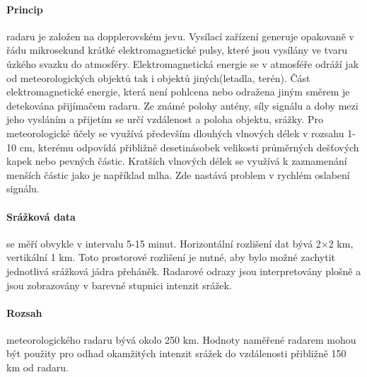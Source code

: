 \documentclass[a4paper,12pt]{article}
\begin{document}
\paragraph*{Princip}
radaru je založen na dopplerovském jevu.\cite{radar_meterology} Vysílací zařízení generuje opakovaně v řádu mikrosekund krátké elektromagnetické pulsy, které jsou vysílány ve tvaru úzkého svazku do atmosféry. Elektromagnetická energie se v atmosféře odráží jak od meteorologických objektů tak i objektů jiných(letadla, terén). Část elektromagnetické energie, která není pohlcena nebo odražena jiným směrem je detekována přijímačem radaru. Ze známé polohy antény, síly signálu a doby mezi jeho vysláním a přijetím se určí vzdálenost a poloha objektu, srážky. 
Pro meteorologické účely se využívá především dlouhých vlnových délek v rozsahu 1-10 cm, kterému odpovídá přibližně desetinásobek velikosti průměrných dešťových kapek nebo pevných částic. Kratších vlnových délek se využívá k zaznamenání menších částic jako je například mlha. Zde nastává problem v rychlém oslabení signálu.\cite{doppler}

\paragraph*{Srážková data}se měří obvykle v intervalu 5-15 minut. Horizontální rozlišení dat bývá 2×2 km, vertikální 1 km. Toto prostorové rozlišení je nutné, aby bylo možné zachytit jednotlivá srážková jádra přeháněk. Radarové odrazy jsou interpretovány plošně a jsou zobrazovány v barevné stupnici intenzit srážek.
\paragraph*{Rozsah} meteorologického radaru bývá okolo 250 km. Hodnoty naměřené radarem mohou být použity pro odhad okamžitých intenzit srážek do vzdálenosti přibližně 150 km od radaru.\cite{kohout}
\end{document}
